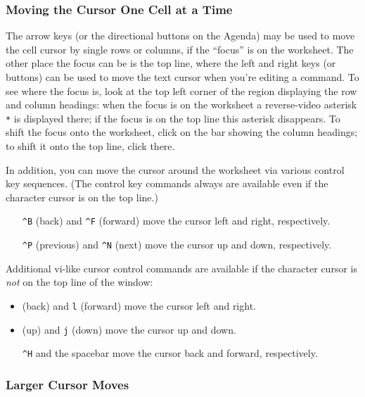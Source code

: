 \documentclass[titlepage]{article}
\newcommand{\titem}[1]{\item[{\tt #1}]}
\newcommand{\ctrl}[1]{\texttt{\^{}#1}}
\begin{document}
\subsubsection{Moving the Cursor One Cell at a Time}

The arrow keys (or the directional buttons on the Agenda) may be used
to move the cell cursor by single rows or columns, if the ``focus'' is
on the worksheet.  The other place the focus can be is the top line,
where the left and right keys (or buttons) can be used to move the
text cursor when you're editing a command.  To see where the focus is,
look at the top left corner of the region displaying the row and
column headings: when the focus is on the worksheet a reverse-video
asterisk \texttt{*} is displayed there; if the focus is on the top
line this asterisk disappears.  To shift the focus onto the worksheet,
click on the bar showing the column headings; to shift it onto the top
line, click there.

In addition, you can move the cursor around the worksheet via various
control key sequences.  (The control key commands always are available
even if the character cursor is on the top line.)

\begin{itemize}
\item[\ctrl{B}] (back) and \ctrl{F} (forward) move the
  cursor left and right, respectively.
\item[\ctrl{P}] (previous) and \ctrl{N} (next) move the
  cursor up and down, respectively.
\end{itemize}
  
Additional \textsf{vi}-like cursor control commands are available if
the character cursor is \textit{not} on the top line of the window:

\begin{itemize}
\titem{h} (back) and \texttt{l} (forward) move the cursor left
  and right.
\titem{k} (up) and \texttt{j} (down) move the cursor up and
  down.
\item[\ctrl{H}] and the spacebar move the cursor back and
  forward, respectively.
\end{itemize}

\subsubsection*{Larger Cursor Moves}
\end{document}
